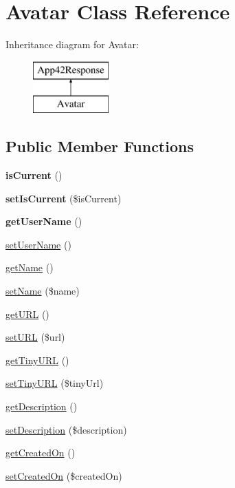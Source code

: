 \hypertarget{class_avatar}{\section{Avatar Class Reference}
\label{class_avatar}
}
Inheritance diagram for Avatar\+:\begin{figure}[H]
\begin{center}
\leavevmode
\includegraphics[height=2.000000cm]{class_avatar}
\end{center}
\end{figure}
\subsection*{Public Member Functions}
\begin{DoxyCompactItemize}
\item 
\hypertarget{class_avatar_ac8846c2cd59db6a04b37a1b80e62dc23}{{\bfseries is\+Current} ()}\label{class_avatar_ac8846c2cd59db6a04b37a1b80e62dc23}

\item 
\hypertarget{class_avatar_a8f1621d8bbd968f599dfbeacd645c56c}{{\bfseries set\+Is\+Current} (\$is\+Current)}\label{class_avatar_a8f1621d8bbd968f599dfbeacd645c56c}

\item 
\hypertarget{class_avatar_aafd6d1ef27e6acc5833aba4012e5ee77}{{\bfseries get\+User\+Name} ()}\label{class_avatar_aafd6d1ef27e6acc5833aba4012e5ee77}

\item 
\hyperlink{class_avatar_ae977280edddf8150f1bb1006be0daec6}{set\+User\+Name} ()
\item 
\hyperlink{class_avatar_a3d0963e68bb313b163a73f2803c64600}{get\+Name} ()
\item 
\hyperlink{class_avatar_a2fe666694997d047711d7653eca2f132}{set\+Name} (\$name)
\item 
\hyperlink{class_avatar_a7fab9ce25511a132269e791a5308f7b7}{get\+U\+R\+L} ()
\item 
\hyperlink{class_avatar_a5a4415db7a7e36f85a4d975c892b0470}{set\+U\+R\+L} (\$url)
\item 
\hyperlink{class_avatar_a6337126ece1f12aa252a27ee0bd4242d}{get\+Tiny\+U\+R\+L} ()
\item 
\hyperlink{class_avatar_a59d5189e4117df50495e23c140dcbeb8}{set\+Tiny\+U\+R\+L} (\$tiny\+Url)
\item 
\hyperlink{class_avatar_a2e7bb35c71bf1824456ceb944cb7a845}{get\+Description} ()
\item 
\hyperlink{class_avatar_a31fad3e39336ea079ea758e051866627}{set\+Description} (\$description)
\item 
\hyperlink{class_avatar_a346b90b05b25684ab3d2c62566270551}{get\+Created\+On} ()
\item 
\hyperlink{class_avatar_adff89ef96f7c1e0f0752caca8ccc750b}{set\+Created\+On} (\$created\+On)
\end{DoxyCompactItemize}
